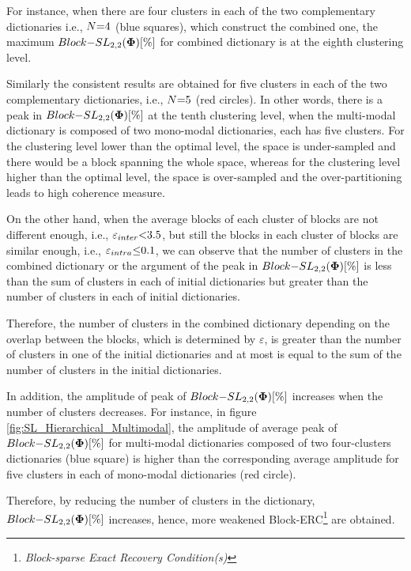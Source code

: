 For instance, when there are four clusters in each of the two complementary dictionaries i.e., $N {=} 4$ (blue squares), which construct the combined one, the maximum $Block{-}SL_{2,2}(\boldsymbol{\Phi})[\%]$ for combined dictionary is at the eighth clustering level.

Similarly the consistent results are obtained for five clusters in each of the two complementary dictionaries, i.e., $N {=} 5$ (red circles).
In other words, there is a peak in $Block{-}SL_{2,2}(\boldsymbol{\Phi})[\%]$ at the tenth clustering level, when the multi-modal dictionary is composed of two mono-modal dictionaries, each has five clusters.
For the clustering level lower than the optimal level, the space is under-sampled and there would be a block spanning the whole space, whereas for the clustering level higher than the optimal level, the space is over-sampled and the over-partitioning leads to high coherence measure.

On the other hand, when the average blocks of each cluster of blocks are not different enough, i.e., $\varepsilon_{inter} {<} 3.5$, but still the blocks in each cluster of blocks are similar enough, i.e., $\varepsilon_{intra} {\leq} 0.1$, we can observe that the number of clusters in the combined dictionary or the argument of the peak in $Block{-}SL_{2,2}(\boldsymbol{\Phi})[\%]$ is less than the sum of clusters in each of initial dictionaries but greater than the number of clusters in each of initial dictionaries.
\newpage

Therefore, the number of clusters in the combined dictionary depending on the overlap between the blocks, which is determined by $\varepsilon$, is greater than the number of clusters in one of the initial dictionaries and at most is equal to the sum of the number of clusters in the initial dictionaries.

In addition, the amplitude of peak of $Block{-}SL_{2,2}(\boldsymbol{\Phi})[\%]$ increases when the number of clusters decreases.
For instance, in figure \ref{fig:SL_Hierarchical_Multimodal}, the amplitude of average peak of $Block{-}SL_{2,2}(\boldsymbol{\Phi})[\%]$ for multi-modal dictionaries composed of two four-clusters dictionaries (blue square) is higher than the corresponding average amplitude for five clusters in each of mono-modal dictionaries (red circle).

Therefore, by reducing the number of clusters in the dictionary, $Block{-}SL_{2,2}(\boldsymbol{\Phi})[\%]$ increases, hence, more weakened Block-ERC\footnote{\emph{Block-sparse Exact Recovery Condition(s)}} are obtained. 

\FloatBarrier